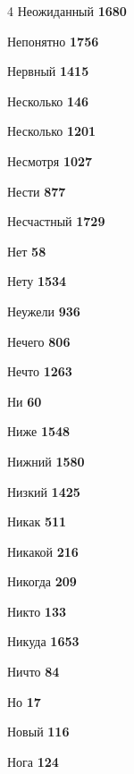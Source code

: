 \begin{multicols}{4}
\noindent Неожиданный \dotfill \textbf{\color{secondary} 1680}\par
\noindent Непонятно \dotfill \textbf{\color{secondary} 1756}\par
\noindent Нервный \dotfill \textbf{\color{secondary} 1415}\par
\noindent Несколько \dotfill \textbf{\color{secondary} 146}\par
\noindent Несколько \dotfill \textbf{\color{secondary} 1201}\par
\noindent Несмотря \dotfill \textbf{\color{secondary} 1027}\par
\noindent Нести \dotfill \textbf{\color{secondary} 877}\par
\noindent Несчастный \dotfill \textbf{\color{secondary} 1729}\par
\noindent Нет \dotfill \textbf{\color{secondary} 58}\par
\noindent Нету \dotfill \textbf{\color{secondary} 1534}\par
\noindent Неужели \dotfill \textbf{\color{secondary} 936}\par
\noindent Нечего \dotfill \textbf{\color{secondary} 806}\par
\noindent Нечто \dotfill \textbf{\color{secondary} 1263}\par
\noindent Ни \dotfill \textbf{\color{secondary} 60}\par
\noindent Ниже \dotfill \textbf{\color{secondary} 1548}\par
\noindent Нижний \dotfill \textbf{\color{secondary} 1580}\par
\noindent Низкий \dotfill \textbf{\color{secondary} 1425}\par
\noindent Никак \dotfill \textbf{\color{secondary} 511}\par
\noindent Никакой \dotfill \textbf{\color{secondary} 216}\par
\noindent Никогда \dotfill \textbf{\color{secondary} 209}\par
\noindent Никто \dotfill \textbf{\color{secondary} 133}\par
\noindent Никуда \dotfill \textbf{\color{secondary} 1653}\par
\noindent Ничто \dotfill \textbf{\color{secondary} 84}\par
\noindent Но \dotfill \textbf{\color{secondary} 17}\par
\noindent Новый \dotfill \textbf{\color{secondary} 116}\par
\noindent Нога \dotfill \textbf{\color{secondary} 124}\par

\end{multicols}
